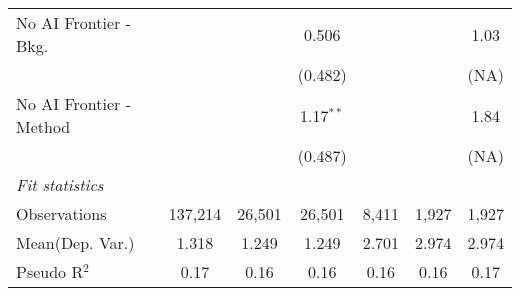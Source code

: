 \begin{tabular}{lcccccc}
   No AI Frontier - Bkg.   &              &              & 0.506       &         &       & 1.03\\   
                           &              &              & (0.482)     &         &       & (NA)\\   
   No AI Frontier - Method &              &              & 1.17$^{**}$ &         &       & 1.84\\   
                           &              &              & (0.487)     &         &       & (NA)\\   
   \midrule
   \emph{Fit statistics}\\
   Observations            & 137,214      & 26,501       & 26,501      & 8,411   & 1,927 & 1,927\\  
Mean(Dep. Var.) & 1.318 & 1.249 & 1.249 & 2.701 & 2.974 & 2.974 \\
   Pseudo R$^2$            & 0.17         & 0.16         & 0.16        & 0.16    & 0.16  & 0.17\\  
   

\end{tabular}
